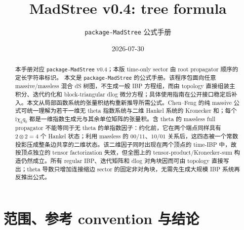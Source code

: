\documentclass[11pt,a4paper]{ctexart}
\title{MadStree v0.4: tree formula}
\author{\texttt{package-MadStree} 公式手册}
\date{2026-07-30}
\newcommand{\ii}{\mathrm i}
\begin{document}
\maketitle

\begin{abstract}
本手册对应 \texttt{package-MadStree} v0.4；本版 time-only sector 由 root propagator 顺序的定长字符串标识。
本文是 \texttt{package-MadStree} 的公式手册。该程序包面向任意 massive/massless 混合 dS 树图，不生成一般 IBP 方程组，而由 topology 直接组装主积分、迭代约化和 block-triangular dlog 微分方程；具体使用指南在公开接口稳定后补入。本文从局部函数系统的张量积结构重新推导所需公式。Chen--Feng 的纯 massive 公式可统一理解为若干一维无 theta 指数系统与二维 Hankel 系统的 Kronecker 和；每个 $\ii\chi_bq_b$ 都是一维指数生成元与其余单位矩阵的张量积。含 theta 的 massless full propagator 不能等同于无 theta 的单指数因子：约化前，它在两个端点同样具有 $2\otimes2=4$ 个 Hankel 状态；利用 massless 的 $00/11$、$10/01$ 关系后，这四态被一个常数投影压成整条边共享的二维状态。该二维因子同时出现在两个顶点的 time-IBP 中，故按顶点独立的 tensor factorization 失效，但全图上的 tensor-product/Kronecker-sum 构造仍然成立。所有 regular IBP、迭代矩阵和 dlog 对角块因而可由 topology 直接写出；theta 导数只增加连接缩边 sector 的固定非对角块，无需先生成大规模 IBP 系统再反推出公式。
\end{abstract}

\tableofcontents

\section{范围、参考 convention 与结论}
\end{document}
